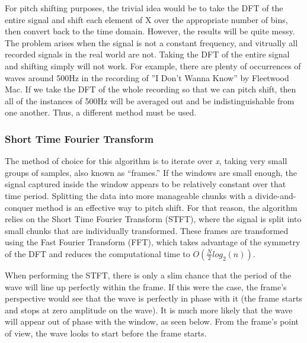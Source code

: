 \documentclass{article}
\begin{document}
For pitch shifting purposes, the trivial idea would be to take the DFT of the entire signal and shift each element of X over the appropriate number of bins, then convert back to the time domain. However, the results will be quite messy. The problem arises when the signal is not a constant frequency, and vitrually all recorded signals in the real world are not. Taking the DFT of the entire signal and shifting simply  will not work. For example, there are plenty of occurrences of waves around 500Hz in the recording of ''I Don’t Wanna Know'' by Fleetwood Mac. If we take the DFT of the whole recording so that we can pitch shift, then all of the instances of 500Hz will be averaged out and be indistinguishable from one another. Thus, a different method must be used.
	
\subsubsection{Short Time Fourier Transform}
The method of choice for this algorithm is to iterate over \textit{x}, taking very small groups of samples, also known as “frames.” If the windows are small enough, the signal captured inside the window appears to be relatively constant over that time period. Splitting the data into more manageable chunks with a divide-and-conquer method is an effective way to pitch shift. For that reason, the algorithm relies on the Short Time Fourier Transform (STFT), where the signal is split into small chunks that are individually transformed. These frames are transformed using the Fast Fourier Transform (FFT), which takes advantage of the symmetry of the DFT and reduces the computational time to $O(\frac{N}{2}log_2(n))$.

When performing the STFT, there is only a slim chance that the period of the wave will line up perfectly within the frame. If this were the case, the frame's perspective would see that the wave is perfectly in phase with it (the frame starts and stops at zero amplitude on the wave). It is much more likely that the wave will appear out of phase with the window, as seen below. From the frame's point of view, the wave looks to start before the frame starts.

\begin{figure}[h]
\hfill
{}
\hfill
{}
\hfill
\end{figure}
\end{document}
